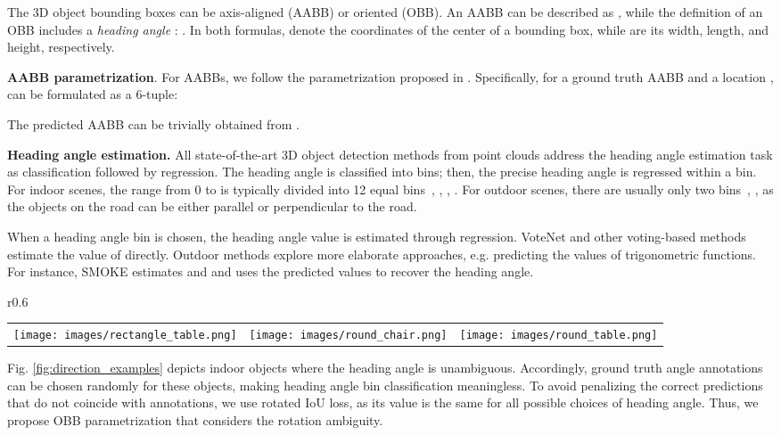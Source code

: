 \documentclass[runningheads]{llncs}
\begin{document}
The 3D object bounding boxes can be axis-aligned (AABB) or oriented (OBB). An AABB can be described as , while the definition of an OBB includes a \textit{heading angle} : . In both formulas,  denote the coordinates of the center of a bounding box, while  are its width, length, and height, respectively.

\textbf{AABB parametrization}. For AABBs, we follow the parametrization proposed in \cite{rukhovich2021imvoxelnet}. Specifically, for a ground truth AABB  and a location ,  can be formulated as a 6-tuple:

The predicted AABB  can be trivially obtained from .

\textbf{Heading angle estimation.} All state-of-the-art 3D object detection methods from point clouds address the heading angle estimation task as classification followed by regression. The heading angle is classified into bins; then, the precise heading angle is regressed within a bin. For indoor scenes, the range from 0 to  is typically divided into 12 equal bins~\cite{qi2019votenet}, \cite{qi2020imvotenet}, \cite{zhang2020h3dnet}, \cite{misra20213detr}. For outdoor scenes, there are usually only two bins~\cite{yan2018second}, \cite{lang2019pointpillars}, as the objects on the road can be either parallel or perpendicular to the road.

When a heading angle bin is chosen, the heading angle value is estimated through regression. VoteNet and other voting-based methods estimate the value of  directly. Outdoor methods explore more elaborate approaches, e.g. predicting the values of trigonometric functions. For instance, SMOKE \cite{liu2020smoke} estimates  and  and uses the predicted values to recover the heading angle. 

\begin{wrapfigure}{r}{0.6\textwidth}
\setlength{\tabcolsep}{2pt}
\begin{tabular}{ccc}
    \texttt{[image: images/rectangle\_table.png]} &
    \texttt{[image: images/round\_chair.png]} &
    \texttt{[image: images/round\_table.png]}
\end{tabular}
\caption{Examples of objects with an ambiguous heading angle.}
\label{fig:direction_examples}
\end{wrapfigure}



Fig. \ref{fig:direction_examples} depicts indoor objects where the heading angle is unambiguous. Accordingly, ground truth angle annotations can be chosen randomly for these objects, making heading angle bin classification meaningless. To avoid penalizing the correct predictions that do not coincide with annotations, we use rotated IoU loss, as its value is the same for all possible choices of heading angle. Thus, we propose OBB parametrization that considers the rotation ambiguity.  
\end{document}
